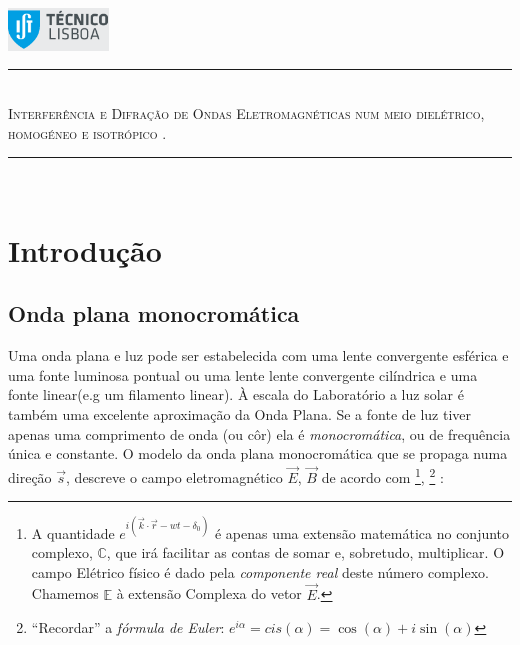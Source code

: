 \documentclass[a4paper,12pt]{article}
\author{Prof. Bernardo B. Carvalho}
\date{ Outubro 2012}
\newcommand{\HRule}{\rule{\linewidth}{0.5mm}}
\begin{document}
 

	\includegraphics[width=0.2\textwidth]{../logo-ist}%

	\HRule \\[0.5cm]
	{ \huge \sf  \textsc{Interferência e Difração de Ondas Eletromagnéticas num meio dielétrico, homogéneo e isotrópico .}} \\[0.4cm] %
	\HRule \\%





\section{\sf Introdução}
\subsection{\sf Onda plana monocromática }

Uma onda plana e luz pode ser estabelecida com uma lente convergente esférica e uma fonte luminosa pontual ou uma lente lente convergente cilíndrica 
e uma fonte linear(e.g um filamento linear).  À escala do Laboratório a luz solar é também uma excelente aproximação da Onda Plana.
Se a fonte de luz tiver apenas uma comprimento de onda (ou côr) ela é \emph{monocromática}, ou de frequência única e constante.
O modelo da onda plana monocromática que se propaga numa direção $\vec{s}$, descreve o campo  eletromagnético $\vec{E}$, $\vec{B}$ de acordo com
\footnote{A quantidade $e^{ i (\vec{k} \cdot \vec{r} -wt - \delta_0)}$ é apenas uma extensão matemática no conjunto complexo, $\mathbb{C}$,  que irá facilitar as contas de somar e, sobretudo, multiplicar. O campo Elétrico físico é dado pela \emph{componente real} deste número complexo. Chamemos $\mathbb{E}$ à extensão Complexa do vetor  $\vec{E}$.}, 
\footnote{``Recordar''  a \emph{fórmula de Euler}: $e^{i \alpha} = cis(\alpha) = \cos(\alpha) + i \sin(\alpha)$} :
\end{document}
